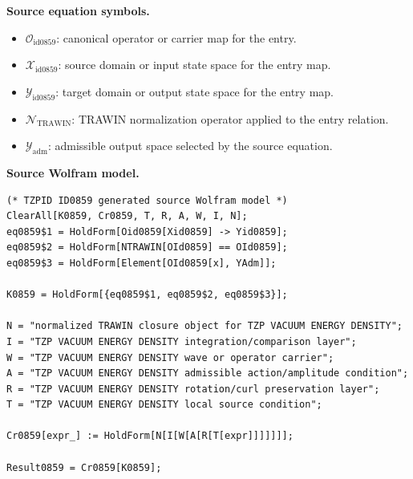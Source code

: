 \begin{minipage}[t]{0.49\linewidth}
\begingroup
\small
\raggedright
\textbf{Source equation symbols.}\par
\begin{itemize}[leftmargin=1.35em,itemsep=1pt,topsep=1pt,parsep=0pt]
    \item $\mathcal{O}_{\mathrm{id0859}}$: canonical operator or carrier map for the entry.
    \item $\mathcal{X}_{\mathrm{id0859}}$: source domain or input state space for the entry map.
    \item $\mathcal{Y}_{\mathrm{id0859}}$: target domain or output state space for the entry map.
    \item $\mathcal{N}_{\mathrm{TRAWIN}}$: TRAWIN normalization operator applied to the entry relation.
    \item $\mathcal{Y}_{\mathrm{adm}}$: admissible output space selected by the source equation.
\end{itemize}
\endgroup
\end{minipage}\hfill
\begin{minipage}[t]{0.47\linewidth}
\begingroup
\scriptsize
\raggedright
\textbf{Source Wolfram model.}\par
\begin{Verbatim}[fontsize=\tiny,breaklines=true,breakanywhere=true]
(* TZPID ID0859 generated source Wolfram model *)
ClearAll[K0859, Cr0859, T, R, A, W, I, N];
eq0859$1 = HoldForm[Oid0859[Xid0859] -> Yid0859];
eq0859$2 = HoldForm[NTRAWIN[OId0859] == OId0859];
eq0859$3 = HoldForm[Element[OId0859[x], YAdm]];

K0859 = HoldForm[{eq0859$1, eq0859$2, eq0859$3}];

N = "normalized TRAWIN closure object for TZP VACUUM ENERGY DENSITY";
I = "TZP VACUUM ENERGY DENSITY integration/comparison layer";
W = "TZP VACUUM ENERGY DENSITY wave or operator carrier";
A = "TZP VACUUM ENERGY DENSITY admissible action/amplitude condition";
R = "TZP VACUUM ENERGY DENSITY rotation/curl preservation layer";
T = "TZP VACUUM ENERGY DENSITY local source condition";

Cr0859[expr_] := HoldForm[N[I[W[A[R[T[expr]]]]]]];

Result0859 = Cr0859[K0859];
\end{Verbatim}
\endgroup
\end{minipage}

